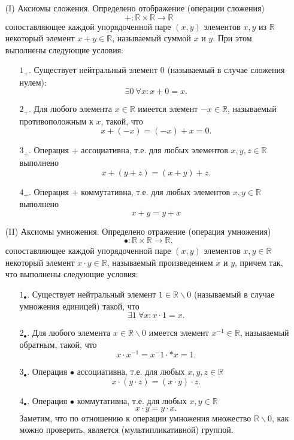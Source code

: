 \documentclass[a4paper, 12pt]{article} %
\begin{document}
\begin{enumerate}
    \item [(I)] Аксиомы сложения. Определено отображение (операции сложения)
          $$ + : \mathbb{R} \times \mathbb{R} \to \mathbb{R} $$
          сопоставляющее каждой упорядоченной паре $(x, y)$ элементов $x, y$ из $\mathbb{R}$ некоторый элемент $x+y \in \mathbb{R}$, называемый суммой $x$ и $y$. При этом выполнены следующие условия:
          \begin{enumerate}
              \item [$1_+.$] Существует нейтральный элемент 0 (называемый в случае сложения нулем):
                    $$ \exists 0 \ \forall x: x + 0 = x. $$
              \item [$2_+.$] Для любого элемента $x \in \mathbb{R}$ имеется элемент $-x \in \mathbb{R}$, называемый противоположным к $x$, такой, что
                    $$ x + (-x) = (-x) + x = 0. $$
              \item [$3_+.$] Операция + ассоциативна, т.е. для любых элементов $x, y, z \in \mathbb{R}$ выполнено $$ x + (y + z) = (x + y) + z. $$
              \item [$4_+.$] Операция + коммутативна, т.е. для любых элементов $x, y \in \mathbb{R}$ выполнено $$ x + y = y + x $$
          \end{enumerate}
    \item [(II)] Аксиомы умножения. Определено отражение (операция умножения) $$ \bullet : \mathbb{R} \times \mathbb{R} \to \mathbb{R}, $$ сопоставляющее каждой упорядоченной паре $(x, y)$ элементов $x, y \in \mathbb{R}$ некоторый элемент $x \cdot y \in \mathbb{R}$, называемый произведением $x$ и $y$, причем так, что выполнены следующие условия:
          \begin{enumerate}
              \item [$1_\bullet.$] Существует нейтральный элемент $1 \in \mathbb{R} \backslash 0$ (называемый в случае умножения единицей) такой, что $$ \exists 1 \ \forall x: x \cdot 1 = x.$$
              \item [$2_\bullet.$] Для любого элемента $x \in \mathbb{R} \backslash 0$ имеется элемент $x^{-1} \in \mathbb{R}$, называемый обратным, такой, что $$ x \cdot x^{-1} = x^-1 \cdot * x = 1.$$
              \item [$3_\bullet.$] Операция $\bullet$ ассоциативна, т.е. для любых $x, y, z \in \mathbb{R}$ $$ x \cdot (y \cdot z) = (x \cdot y) \cdot z.$$
              \item [$4_\bullet.$] Операция $\bullet$ коммутативна, т.е. для любых $x, y \in \mathbb{R}$ $$ x \cdot y = y \cdot x.$$
                    Заметим, что по отношению к операции умножения множество $\mathbb{R} \backslash 0$, как можно проверить, является (мультипликативной) группой.
          \end{enumerate}
\end{enumerate}
\end{document}

